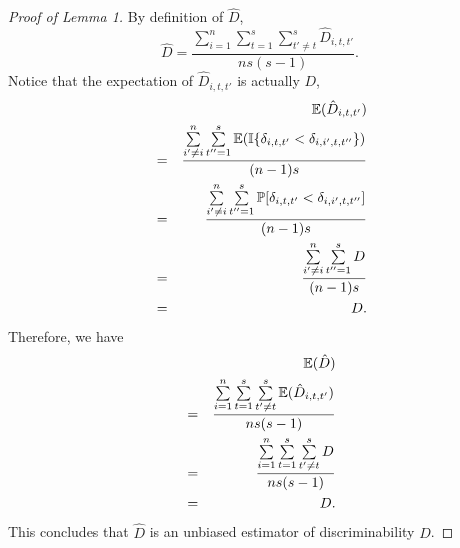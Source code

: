 \documentclass{article}
\begin{document}
\begin{proof}[Proof of Lemma 1]
	By definition of $\hat{D}$,
	\[\hat{D}= \frac{\sum\limits_{i=1}^{n} \sum\limits_{t=1}^{s}  \sum\limits_{t'\neq t}^{s} \hat{D}_{i,t,t'}}{ns(s-1)}.\]
	Notice that the expectation of $\hat{D}_{i,t,t'}$ is actually $D$,
	\begin{eqnarray*}  
		& &\mathbb{E}(\hat{D}_{i,t,t'}) \\
		&=&\frac{\sum\limits_{i' \neq i}^{n} \sum\limits_{t''=1}^{s} 		    	 \mathbb{E}(\mathbb{I}\{\delta_{i,t,t'} < \delta_{i,i',t,t''} \}) }{(n-1)s} \\
		&=&\frac{\sum\limits_{i' \neq i}^{n} \sum\limits_{t''=1}^{s} 
		     	\mathbb{P}[\delta_{i,t,t'} < \delta_{i,i',t,t''}]}{(n-1)s} \\
		&=& \frac{\sum\limits_{i' \neq i}^{n} \sum\limits_{t''=1}^{s} 
			D}{(n-1)s} \\
		&=& D .
	\end{eqnarray*}
	Therefore, we have
	\begin{eqnarray*}
		& &\mathbb{E}(\hat{D})\\
		&=&\frac{\sum\limits_{i=1}^{n} \sum\limits_{t=1}^{s}  \sum\limits_{t'\neq t}^{s} \mathbb{E}(\hat{D}_{i,t,t'})}{ns(s-1)} \\
		&=&\frac{\sum\limits_{i=1}^{n} \sum\limits_{t=1}^{s}  \sum\limits_{t'\neq t}^{s} D}{ns(s-1)} \\
		&=& D.
	\end{eqnarray*}
	This concludes that $\hat{D}$ is an unbiased estimator of discriminability $D$.
\end{proof}
\end{document}
